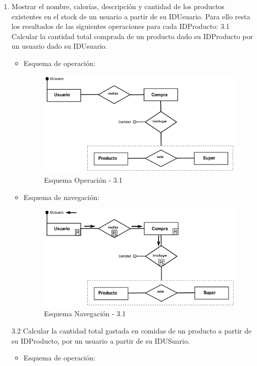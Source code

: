 \documentclass[a4paper,12pt]{report}
\begin{document}
\begin{enumerate}
\item Mostrar el nombre, calorías, descripción y cantidad de los
productos existentes en el stock de un usuario a partir de su
IDUsuario. Para ello resta los resultados de las siguientes operaciones para cada IDProducto:
3.1 Calcular la cantidad total comprada de un producto dado su IDProducto por un usuario dado su IDUsuario.
\begin{itemize}
\item Esquema de operación:
\begin{figure}[!htp]
\centering
\includegraphics[width=0.9\linewidth]{./operaciones/img/Estadisticas/31_ope.png}
\caption{Esquema Operación - 3.1}
\label{fig:ope31}
\medskip
\footnotesize
{}
\end{figure}
\item Esquema de navegación:
\begin{figure}[!htp]
\centering
\includegraphics[width=0.9\linewidth]{./operaciones/img/Estadisticas/31_nav.png}
\caption{Esquema Navegación - 3.1}
\label{fig:nave31}
\medskip
\footnotesize
{}
\end{figure}
\end{itemize}
3.2 Calcular la cantidad total gastada en comidas de un producto a partir de su IDProducto, por un usuario a partir de su IDUSuario.
\begin{itemize}
\item Esquema de operación:

\end{itemize}
\end{enumerate}
\end{document}
